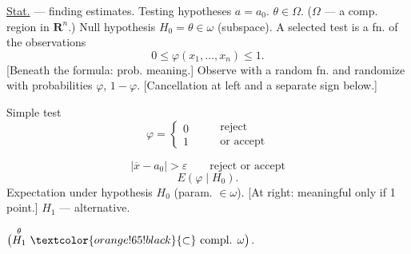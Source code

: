 \underline{Stat.} --- finding estimates.
Testing hypotheses $a=a_0$.
$\theta\in\Omega$.
($\Omega$ --- a comp. region in $\mathbf R^n$.)
Null hypothesis $H_0=\theta\in\omega$ (subspace).
A selected test is a fn. of the observations
\begin{equation*}
0\le\varphi(x_1,\ldots,x_n)\le1.
\end{equation*}
[Beneath the formula: prob. meaning.]
Observe with a random fn. and randomize with probabilities $\varphi$, $1-\varphi$.
[Cancellation at left and a separate sign below.]
\par\noindent\begin{minipage}{\linewidth}
Simple test
\begin{equation*}
\varphi=\begin{cases}0\\1\end{cases}\qquad\begin{gathered}\text{reject}\\\text{or accept}\end{gathered}
\end{equation*}
\end{minipage}\par
[Downward arrow to the example:]
\begin{equation*}
|\overline x-a_0|>\varepsilon\qquad\text{reject or accept}
\end{equation*}
\begin{equation*}
E(\varphi\mid H_0).
\end{equation*}
Expectation under hypothesis $H_0$ (param. $\in\omega$).
[At right: meaningful only if 1 point.]
$H_1$ --- alternative.
\par\noindent\begin{minipage}{\linewidth}
$\bigl(\overset{\theta}{H_1}\ \textcolor{orange!65!black}{\subset}\ \text{compl. }\omega\bigr)$.
\end{minipage}\par
